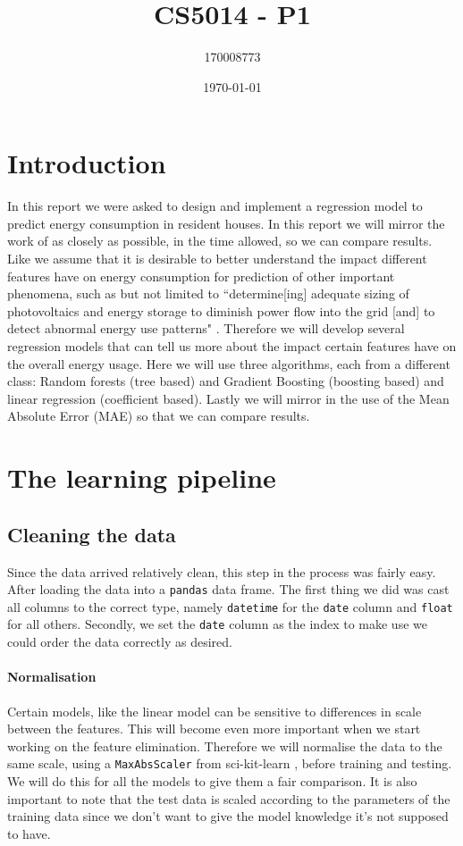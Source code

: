 \documentclass[british]{article}
\title{CS5014 - P1}
\author{170008773}
\date{\today}
\newcommand{\code}[1]{\texttt{#1}}
\begin{document}
	\maketitle
	
	
	
	
	\section{Introduction}
	\label{intro}
	In this report we were asked to design and implement a regression model to predict energy consumption in resident houses. In this report we will mirror the work of \autocite{Candanedo2017} as closely as possible, in the time allowed, so we can compare results. Like \citeauthor{Candanedo2017} we  assume that it is desirable to better understand the impact different features have on energy consumption for prediction of other important phenomena, such as but not limited to ``determine[ing] adequate sizing of photovoltaics and energy storage to diminish power flow into the grid [and] to detect abnormal energy use patterns" \autocite{Candanedo2017}. Therefore we will develop several regression models that can tell us more about the impact certain features have on the overall energy usage. Here we will use three algorithms, each from a different class: Random forests (tree based) and Gradient Boosting (boosting based) and linear regression (coefficient based). Lastly we will mirror \citeauthor{Candanedo2017} in the use of the Mean Absolute Error (MAE) so that we can compare results. 
	
	\section{The learning pipeline}
	\label{content}
	
	\subsection{Cleaning the data}
	\label{cleaning}
	Since the data arrived relatively clean, this step in the process was fairly easy. After loading the data into a \code{pandas} data frame. The first thing we did was cast all columns to the correct type, namely \code{datetime} for the \code{date} column and \code{float} for all others. Secondly, we set the \code{date} column as the index to make use we could order the data correctly as desired. 
	
	\paragraph{Normalisation} Certain models, like the linear model can be sensitive to differences in scale between the features. This will become even more important when we start working on the feature elimination. Therefore we will normalise the data to the same scale, using a \code{MaxAbsScaler} from sci-kit-learn \autocite{Pedregosa2012}, before training and testing. We will do this for all the models to give them a fair comparison. It is also important to note that the test data is scaled according to the parameters of the training data since we don't want to give the model knowledge it's not supposed to have. 
	
\end{document}
